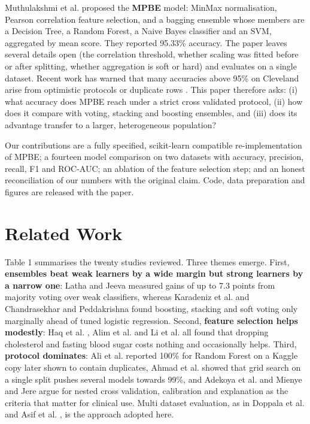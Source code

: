 \documentclass[runningheads]{llncs}
\begin{document}
Muthulakshmi et al. \cite{r1} proposed the \textbf{MPBE} model: MinMax normalisation, Pearson correlation feature selection, and a bagging ensemble whose members are a Decision Tree, a Random Forest, a Naive Bayes classifier and an SVM, aggregated by mean score. They reported 95.33\% accuracy. The paper leaves several details open (the correlation threshold, whether scaling was fitted before or after splitting, whether aggregation is soft or hard) and evaluates on a single dataset. Recent work has warned that many accuracies above 95\% on Cleveland arise from optimistic protocols or duplicate rows \cite{r11,r21}. This paper therefore asks: (i) what accuracy does MPBE reach under a strict cross validated protocol, (ii) how does it compare with voting, stacking and boosting ensembles, and (iii) does its advantage transfer to a larger, heterogeneous population?

Our contributions are a fully specified, scikit-learn compatible re-implementation of MPBE; a fourteen model comparison on two datasets with accuracy, precision, recall, F1 and ROC-AUC; an ablation of the feature selection step; and an honest reconciliation of our numbers with the original claim. Code, data preparation and figures are released with the paper.

\section{Related Work}
Table 1 summarises the twenty studies reviewed. Three themes emerge. First, \textbf{ensembles beat weak learners by a wide margin but strong learners by a narrow one}: Latha and Jeeva \cite{r9} measured gains of up to 7.3 points from majority voting over weak classifiers, whereas Karadeniz et al. \cite{r14} and Chandrasekhar and Peddakrishna \cite{r18} found boosting, stacking and soft voting only marginally ahead of tuned logistic regression. Second, \textbf{feature selection helps modestly}: Haq et al. \cite{r5}, Alim et al. \cite{r7} and Li et al. \cite{r15} all found that dropping cholesterol and fasting blood sugar costs nothing and occasionally helps. Third, \textbf{protocol dominates}: Ali et al. \cite{r11} reported 100\% for Random Forest on a Kaggle copy later shown to contain duplicates, Ahmad et al. \cite{r19} showed that grid search on a single split pushes several models towards 99\%, and Adekoya et al. \cite{r21} and Mienye and Jere \cite{r16} argue for nested cross validation, calibration and explanation as the criteria that matter for clinical use. Multi dataset evaluation, as in Doppala et al. \cite{r6} and Asif et al. \cite{r17}, is the approach adopted here.
\end{document}

